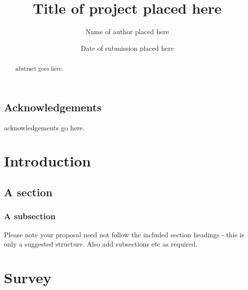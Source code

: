 \documentclass{mproj}
\begin{document}
\title{Title of project placed here}
\author{Name of author placed here}
\date{Date of submission placed here}
\maketitle

\begin{abstract}
abstract goes here.
\end{abstract}

\educationalconsent


\newpage
\section*{Acknowledgements}

acknowledgements go here.

\tableofcontents

\chapter{Introduction}\label{intro}

\section{A section}
\subsection{A subsection}
Please note your proposal need not follow the included section headings - this is only a suggested structure. Also add subsections etc as required.

\chapter{Survey}\label{survey}
\nocite{*}
\end{document}
